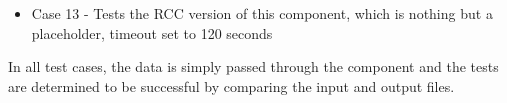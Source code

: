 \documentclass{article}
\begin{document}
\begin{flushleft}
\begin{itemize}
\item Case 13 - Tests the RCC version of this component, which is nothing but a placeholder, timeout set to 120 seconds
\end{itemize}

In all test cases, the data is simply passed through the component and the tests are determined to be successful by comparing the input and output files.

\end{flushleft}
\end{document}
